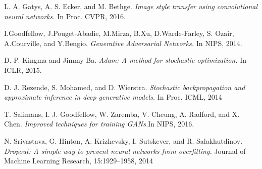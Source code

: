 \begin{thebibliography}{9}
L. A. Gatys, A. S. Ecker, and M. Bethge.
\textit{ Image style transfer using convolutional neural networks.}
In Proc. CVPR, 2016.
 
I.Goodfellow, J.Pouget-Abadie, M.Mirza, B.Xu, D.Warde-Farley, S. Ozair, A.Courville, and Y.Bengio. 
\textit{ Generative Adversarial Networks.} In NIPS, 2014.
 
D. P. Kingma and Jimmy Ba.
\textit{ Adam: A method for stochastic optimization.}  In ICLR, 2015.

D. J. Rezende, S. Mohamed, and D. Wierstra.
\textit{  Stochastic backpropagation and approximate inference in deep generative models.} In Proc. ICML, 2014

T. Salimans, I. J. Goodfellow, W. Zaremba, V. Cheung, A. Radford, and X. Chen.
\textit{  Improved techniques for training GANs.}In NIPS, 2016.

N. Srivastava, G. Hinton, A. Krizhevsky, I. Sutskever, and R. Salakhutdinov.
\textit{  Dropout: A simple way to prevent neural networks from overfitting.}  Journal of Machine Learning Research, 15:1929–1958, 2014

\end{thebibliography}
